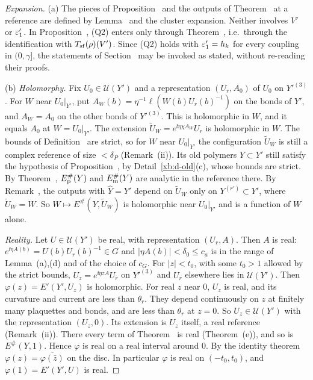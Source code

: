 \begin{proof}[Expansion]
(a) The pieces of Proposition~ and the outputs of Theorem~ at a reference are defined by Lemma~ and the cluster expansion. Neither involves $V'$ or $\varepsilon'_1$. In Proposition~, (Q2) enters only through Theorem~, i.e.\ through the identification with $T_{\rm sf}(\rho)(V')$. Since (Q2) holds with $\varepsilon'_1=h_k$ for every coupling in $(0,\gamma]$, the statements of Section~ may be invoked as stated, without re-reading their proofs.

(b) \emph{Holomorphy.} Fix $U_0\in\mathcal U(Y')$ and a representation $(U_r,A_0)$ of $U_0$ on $Y'^{(3)}$. For $W$ near $U_0|_{Y'}$, put $A_W(b)=\eta^{-1}\ell(W(b)U_r(b)^{-1})$ on the bonds of $Y'$, and $A_W=A_0$ on the other bonds of $Y'^{(3)}$. This is holomorphic in $W$, and it equals $A_0$ at $W=U_0|_{Y'}$. The extension $\tilde U_W=e^{\ii\eta\chi A_W}U_r$ is holomorphic in $W$. The bounds of Definition~ are strict, so for $W$ near $U_0|_{Y'}$ the configuration $\tilde U_W$ is still a complex reference of size $<\delta_P$ (Remark~(ii)). Its old polymers $Y\subset Y'$ still satisfy the hypothesis of Proposition~, by Detail~\ref{xb:d-old}(c), whose bounds are strict. By Theorem~, $E^\#_{\rm p}(Y)$ and $E^\#_{\rm m}(Y)$ are analytic in the reference there. By Remark~, the outputs with $\hat Y=Y'$ depend on $\tilde U_W$ only on $Y^{(r')}\subset Y'$, where $\tilde U_W=W$. So $W\mapsto E^\#(Y,\tilde U_W)$ is holomorphic near $U_0|_{Y'}$ and is a function of $W$ alone.

\emph{Reality.} Let $U\in\mathcal U(Y')$ be real, with representation $(U_r,A)$. Then $A$ is real: $e^{\ii\eta A(b)}=U(b)U_r(b)^{-1}\in G$ and $|\eta A(b)|<\delta_0\le c_a$ is in the range of Lemma~(a),(d) and of the choice of $c_G$. For $|z|<t_0$, with some $t_0>1$ allowed by the strict bounds, $U_z=e^{\ii\eta zA}U_r$ on $Y'^{(3)}$ and $U_r$ elsewhere lies in $\mathcal U(Y')$. Then $\varphi(z)=E'(Y',U_z)$ is holomorphic. For real $z$ near $0$, $U_z$ is real, and its curvature and current are less than $\theta_r$. They depend continuously on $z$ at finitely many plaquettes and bonds, and are less than $\theta_r$ at $z=0$. So $U_z\in\mathcal U(Y')$ with the representation $(U_z,0)$. Its extension is $U_z$ itself, a real reference (Remark~(ii)). There every term of Theorem~ is real (Theorem~(e)), and so is $E^\#(Y,1)$. Hence $\varphi$ is real on a real interval around $0$. By the identity theorem $\varphi(z)=\overline{\varphi(\bar z)}$ on the disc. In particular $\varphi$ is real on $(-t_0,t_0)$, and $\varphi(1)=E'(Y',U)$ is real.


\end{proof}
